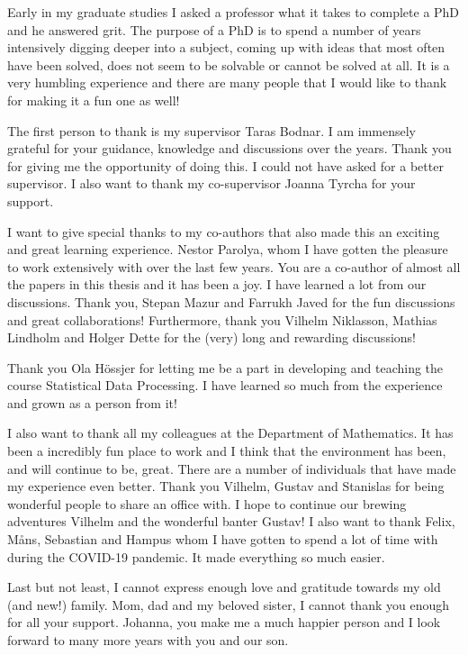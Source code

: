 Early in my graduate studies I asked a professor what it takes to complete a PhD and he answered grit.
The purpose of a PhD is to spend a number of years intensively digging deeper into a subject, coming up with ideas that most often have been solved, does not seem to be solvable or cannot be solved at all.
It is a very humbling experience and there are many people that I would like to thank for making it a fun one as well!

The first person to thank is my supervisor Taras Bodnar.
I am immensely grateful for your guidance, knowledge and discussions over the years.
Thank you for giving me the opportunity of doing this.
I could not have asked for a better supervisor.
I also want to thank my co-supervisor Joanna Tyrcha for your support.

I want to give special thanks to my co-authors that also made this an exciting and great learning experience.
Nestor Parolya, whom I have gotten the pleasure to work extensively with over the last few years. 
You are a co-author of almost all the papers in this thesis and it has been a joy.
I have learned a lot from our discussions.
Thank you, Stepan Mazur and Farrukh Javed for the fun discussions and great collaborations!
Furthermore, thank you Vilhelm Niklasson, Mathias Lindholm and Holger Dette for the (very) long and rewarding discussions! 

Thank you Ola Hössjer for letting me be a part in developing and teaching the course Statistical Data Processing.
I have learned so much from the experience and grown as a person from it!

I also want to thank all my colleagues at the Department of Mathematics.
It has been a incredibly fun place to work and I think that the environment has been, and will continue to be, great.
There are a number of individuals that have made my experience even better.
Thank you Vilhelm, Gustav and Stanislas for being wonderful people to share an office with.
I hope to continue our brewing adventures Vilhelm and the wonderful banter Gustav!
I also want to thank Felix, Måns, Sebastian and Hampus whom I have gotten to spend a lot of time with during the COVID-19 pandemic. 
It made everything so much easier.

Last but not least, I cannot express enough love and gratitude towards my old (and new!) family. 
Mom, dad and my beloved sister, I cannot thank you enough for all your support.
Johanna, you make me a much happier person and I look forward to many more years with you and our son. 